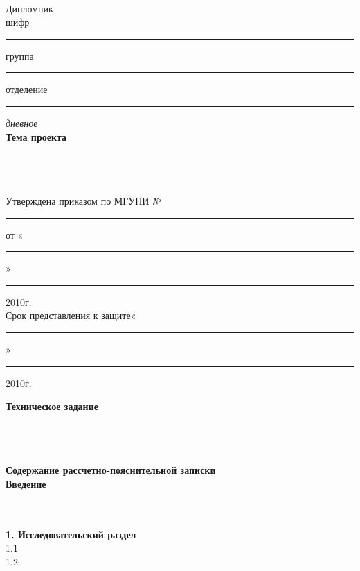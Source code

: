 \begin{titlepage}
\newpage


\begin{center}
\vspace{0.5cm}
 \\
\end{center}

\begin{flushleft}
Дипломник
\hrulefill \\
шифр\rule{5cm}{0.5pt} группа\rule{3cm}{0.5pt} отделение\rule{1cm}{0.5pt}\textit{дневное}\hrulefill \\


\textbf{Тема проекта}\hrulefill \\
\hrulefill \\
\hrulefill \\
\hrulefill \\
\end{flushleft}

\begin{flushleft}
Утверждена приказом по МГУПИ №\rule{2cm}{0.5pt} от «\rule{2cm}{0.5pt}»\rule{2.65cm}{0.5pt}2010г. \\
Срок представления к защите«\rule{2cm}{0.5pt}»\rule{7cm}{0.5pt}2010г. \\
\end{flushleft}

\begin{flushleft}
\textbf{Техническое задание}
\fontsize{8pt}{4.05pt}{\selectfont{(цель и постановка задачи, исходные данные для проектирования)} } \\
\hrulefill \\
\hrulefill \\
\hrulefill \\
\end{flushleft}

\begin{flushleft}
\textbf{Содержание рассчетно-пояснительной записки} \\
\textbf{Введение}
\fontsize{8pt}{8.05pt}{\selectfont{(обоснование актуальности темы)} }\hrulefill \\
\hrulefill \\
\hrulefill \\
\end{flushleft}

\begin{flushleft}
\textbf{1. Исследовательский раздел}
\fontsize{8pt}{1pt}{\selectfont{(материал по исследованию предметной области, предмета проектирования,
анализ вариантов решения задач, выбор конкретного варианта)} } \\
1.1\hrulefill \\
1.2\hrulefill \\
\end{flushleft}


\end{titlepage}
